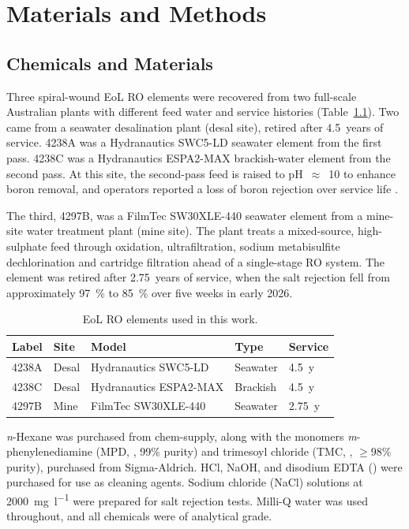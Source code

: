 \chapter{Materials and Methods}
\label{ch:methods}

\section{Chemicals and Materials}
\label{sec:materials}
Three spiral-wound EoL RO elements were recovered from two full-scale Australian plants with different feed water and service histories (Table~\ref{tab:membranes-source}). Two came from a seawater desalination plant (desal site), retired after \qty{4.5}{years} of service. 4238A was a Hydranautics SWC5-LD seawater element from the first pass. 4238C was a Hydranautics ESPA2-MAX brackish-water element from the second pass. At this site, the second-pass feed is raised to pH~$\approx$~10 to enhance boron removal, and operators reported a loss of boron rejection over service life \citep{MembraneWorks2025Desal}. 

The third, 4297B, was a FilmTec SW30XLE-440 seawater element from a mine-site water treatment plant (mine site). The plant treats a mixed-source, high-sulphate feed through  oxidation, ultrafiltration, sodium metabisulfite dechlorination and cartridge filtration ahead of a single-stage RO system. The element was retired after \qty{2.75}{years} of service, when the salt rejection fell from approximately \qty{97}{\percent} to \qty{85}{\percent} over five weeks in early 2026.  \\

\begin{table}[htbp]
  \centering
  \caption{EoL RO elements used in this work.}
  \label{tab:membranes-source}
  \begin{tabular}{|l|l|l|l|l|}
    \hline
    Label & Site  & Model                  & Type     & Service \\
    \hline
    4238A & Desal & Hydranautics SWC5-LD & Seawater & \qty{4.5}{y} \\
    4238C & Desal & Hydranautics ESPA2-MAX & Brackish & \qty{4.5}{y} \\
    4297B & Mine  & FilmTec SW30XLE-440    & Seawater & \qty{2.75}{y}\\
    \hline
  \end{tabular}
\end{table}

\textit{n}-Hexane was purchased from chem-supply, along with the monomers \textit{m}-phenylenediamine (MPD, , 99\% purity) and trimesoyl chloride (TMC, , $\ge98\%$ purity), purchased from Sigma-Aldrich. HCl, NaOH, and disodium EDTA () were purchased for use as cleaning agents. Sodium chloride (NaCl) solutions at \qty{2000}{\milli\gram\per\litre} were prepared for salt rejection tests. Milli-Q water was used throughout, and all chemicals were of analytical grade.


